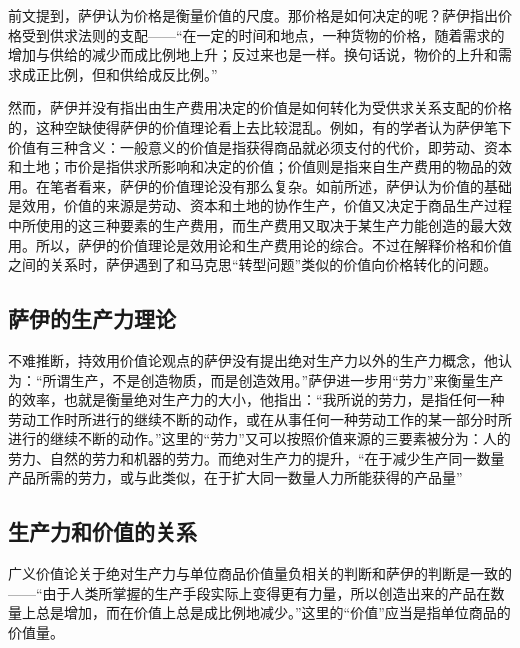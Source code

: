 前文提到，萨伊认为价格是衡量价值的尺度。那价格是如何决定的呢？萨伊指出价格受到供求法则的支配——“在一定的时间和地点，一种货物的价格，随着需求的增加与供给的减少而成比例地上升；反过来也是一样。换句话说，物价的上升和需求成正比例，但和供给成反比例。”\cite[256]{SaYiZhengZhiJingJiXueGaiLunCaiFuDeShengChanFenPeiHeXiaoFei2020}

然而，萨伊并没有指出由生产费用决定的价值是如何转化为受供求关系支配的价格的，这种空缺使得萨伊的价值理论看上去比较混乱。例如，有的学者认为萨伊笔下价值有三种含义：一般意义的价值是指获得商品就必须支付的代价，即劳动、资本和土地；市价是指供求所影响和决定的价值；价值则是指来自生产费用的物品的效用\cite[138]{YanZhiJieXiFangJingJiXueShuoShiJiaoChengDiErBan2013}\cite[175]{CaiJiMingCongGuDianZhengZhiJingJiXueDaoZhongGuoTeSeSheHuiZhuYiZhengZhiJingJiXueJiYuZhongGuoShiJiaoDeZhengZhiJingJiXueYanBianShangCe2023}。在笔者看来，萨伊的价值理论没有那么复杂。如前所述，萨伊认为价值的基础是效用，价值的来源是劳动、资本和土地的协作生产，价值又决定于商品生产过程中所使用的这三种要素的生产费用，而生产费用又取决于某生产力能创造的最大效用。所以，萨伊的价值理论是效用论和生产费用论的综合。不过在解释价格和价值之间的关系时，萨伊遇到了和马克思“转型问题”类似的价值向价格转化的问题。

\subsection{萨伊的生产力理论}

不难推断，持效用价值论观点的萨伊没有提出绝对生产力以外的生产力概念，他认为：“所谓生产，不是创造物质，而是创造效用。”\cite[60]{SaYiZhengZhiJingJiXueGaiLunCaiFuDeShengChanFenPeiHeXiaoFei2020}萨伊进一步用“劳力”来衡量生产的效率，也就是衡量绝对生产力的大小，他指出：“我所说的劳力，是指任何一种劳动工作时所进行的继续不断的动作，或在从事任何一种劳动工作的某一部分时所进行的继续不断的动作。”\cite[90]{SaYiZhengZhiJingJiXueGaiLunCaiFuDeShengChanFenPeiHeXiaoFei2020}这里的“劳力”又可以按照价值来源的三要素被分为：人的劳力、自然的劳力和机器的劳力\cite[90]{SaYiZhengZhiJingJiXueGaiLunCaiFuDeShengChanFenPeiHeXiaoFei2020}。而绝对生产力的提升，“在于减少生产同一数量产品所需的劳力，或与此类似，在于扩大同一数量人力所能获得的产品量”\cite[91]{SaYiZhengZhiJingJiXueGaiLunCaiFuDeShengChanFenPeiHeXiaoFei2020}

\subsection{生产力和价值的关系}

广义价值论关于绝对生产力与单位商品价值量负相关的判断和萨伊的判断是一致的——“由于人类所掌握的生产手段实际上变得更有力量，所以创造出来的产品在数量上总是增加，而在价值上总是成比例地减少。”\cite[369]{SaYiZhengZhiJingJiXueGaiLunCaiFuDeShengChanFenPeiHeXiaoFei2020}这里的“价值”应当是指单位商品的价值量。

